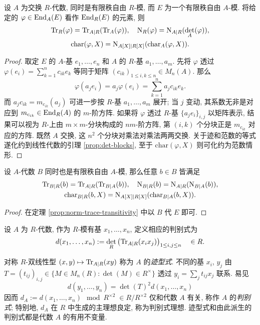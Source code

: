 \begin{theorem}\label{prop:norm-trace-transitivity}
	设 $A$ 为交换 $R$-代数, 同时是有限秩自由 $R$-模, 而 $E$ 为一个有限秩自由 $A$-模. 将给定的 $\varphi \in \operatorname{End}_A(E)$ 看作 $\operatorname{End}_R(E)$ 的元素, 则
	\begin{gather*}
		\operatorname{Tr}_R(\varphi) = \operatorname{Tr}_{A|R}(\operatorname{Tr}_A(\varphi)), \quad \operatorname{N}_R(\varphi) = \operatorname{N}_{A|R}(\det_A(\varphi)), \\
		\mathrm{char}(\varphi, X) = \operatorname{N}_{A[X]|R[X]}(\mathrm{char}_A(\varphi, X)).
	\end{gather*}
\end{theorem}
\begin{proof}
	取定 $E$ 的 $A$-基 $e_1, \ldots, e_n$ 和 $A$ 的 $R$-基 $a_1, \ldots,  a_m$. 先将 $\varphi$ 透过 $\varphi(e_i) = \sum_{k=1}^n c_{ik} e_k$ 等同于矩阵 $(c_{ik})_{1 \leq i,k \leq n} \in M_n(A)$. 那么
	\[ \varphi(a_j e_i) = a_j \varphi(e_i) = \sum_{k=1}^n a_j c_{ik} e_k. \]
	而 $a_j c_{ik} = m_{c_{ik}}(a_j)$ 可进一步按 $R$-基 $a_1, \ldots, a_m$ 展开; 当 $j$ 变动, 其系数无非是对应到 $m_{c_{ik}} \in \operatorname{End}_R(A)$ 的 $m$-阶方阵. 如果将 $\varphi$ 透过 $R$-基 $\{ a_j e_i \}_{i,j}$ 以矩阵表示, 结果可以视为 $R$-上由 $m \times m$-分块构成的 $nm$-阶方阵, 第 $(i,k)$ 个分块正是 $m_{c_{ik}}$ 对应的方阵. 既然 $A$ 交换, 这 $n^2$ 个分块对乘法对乘法两两交换. 关于迹和范数的等式遂化约到线性代数的引理 \ref{prop:det-blocks}, 至于 $\mathrm{char}(\varphi, X)$ 则可化约为范数情形.
\end{proof}

\begin{corollary}\label{prop:norm-trace-transitivity-2}
	设 $A$-代数 $B$ 同时也是有限秩自由 $A$-模, 那么任意 $b \in B$ 皆满足
	\begin{gather*}
		\operatorname{Tr}_{B|R}(b) = \operatorname{Tr}_{A|R}(\operatorname{Tr}_{B|A}(b)), \quad \operatorname{N}_{B|R}(b) = \operatorname{N}_{A|R}(\operatorname{N}_{B|A}(b)), \\
		\mathrm{char}_{B|R}(b,X) = \operatorname{N}_{A[X]|R[X]}(\mathrm{char}_{B|A}(b,X)).
	\end{gather*}
\end{corollary}
\begin{proof}
	在定理 \ref{prop:norm-trace-transitivity} 中以 $B$ 代 $E$ 即可.
\end{proof}

\begin{definition}\label{def:discriminant}
	设 $A$ 为 $R$-代数, 作为 $R$-模有基 $x_1, \ldots, x_n$, 定义相应的判别式为
	\[ d(x_1, \ldots, x_n) := \det_R \left( \operatorname{Tr}_{A|R}(x_i x_j) \right)_{1 \leq i,j \leq n} \quad \in R. \]
\end{definition}
对称 $R$-双线性型 $(x,y) \mapsto \operatorname{Tr}_{A|R}(xy)$ 称为 $A$ 的\emph{迹型式}. 不同的基 $x_i$, $y_j$ 由 $T = (t_{ij})_{i,j} \in \{M \in M_n(R): \det(M) \in R^\times \}$ 透过 $y_i = \sum_j t_{ij} x_j$ 联系. 易见 
\[ d(y_1, \ldots, y_n) = \det(T)^2 d(x_1, \ldots, x_n) \]
因而 $d_A := d(x_1, \ldots, x_n) \mod R^{\times 2}\; \in R/R^{\times 2}$ 仅和代数 $A$ 有关, 称作 $A$ 的\emph{判别式}; 特别地, $d_A$ 在 $R$ 中生成的主理想良定, 称为判别式理想. 迹型式和由此派生的判别式都是代数 $A$ 的有用不变量. 

